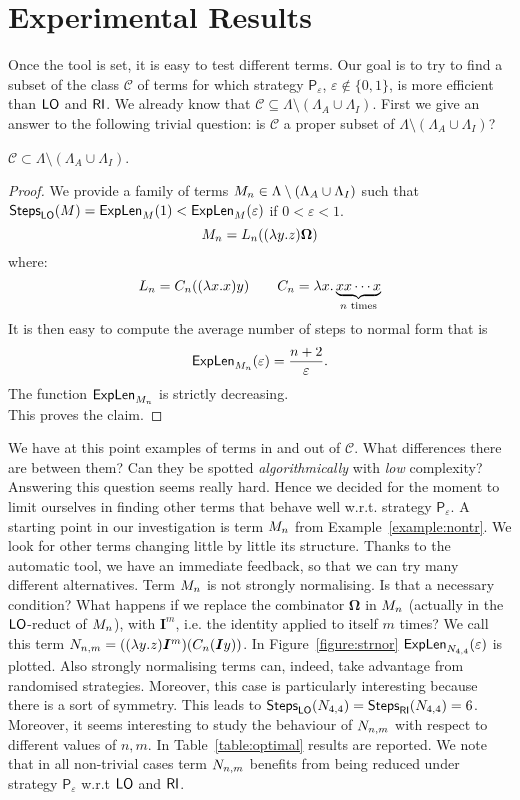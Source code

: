 \section{Experimental Results}
Once the tool is set, it is easy to test different terms. Our goal is to try to find a subset of the class $\mathcal{C}$ of terms for which strategy $\mathsf{P}_\varepsilon$, $\varepsilon\not\in\{0,1\}$, is more efficient than $\textsf{LO}$ and $\textsf{RI}$. We already know that $\mathcal{C}\subseteq\Lambda\setminus(\Lambda_A\cup\Lambda_I)$. First we give an answer to the following trivial question: is $\mathcal{C}$ a proper subset of $\Lambda\setminus(\Lambda_A\cup\Lambda_I)$?
\begin{proposition}\label{prop:strict}
	$\mathcal{C}\subset\Lambda\setminus(\Lambda_A\cup\Lambda_I)$.
\end{proposition}
\begin{proof}
	We provide a family of terms $M_n\in\Lambda\setminus(\Lambda_A\cup\Lambda_I)$ such that $\textsf{Steps}_{\textsf{LO}}(M)=\textsf{ExpLen}_{M}(1)<\textsf{ExpLen}_{M}(\varepsilon)$ if $0<\varepsilon<1$.
	$$
	M_n=L_n((\lambda y.z)\bm{\Omega})
	$$
	where:
	$$
	L_n = C_n((\lambda x.x)y)\qquad
	C_n = \lambda  x.\underbrace{xx\cdots x}_{n\text{ times}}
	$$
	It is then easy to compute the average number of steps to normal form that is
	$$
	\textsf{ExpLen}_{M_n}(\varepsilon)=\frac{n+2}{\varepsilon}.
	$$ 
	The function $\textsf{ExpLen}_{M_n}$ is strictly decreasing.\\
	This proves the claim.
\end{proof}
We have at this point examples of terms in and out of $\mathcal{C}$. What differences there are between them? Can they be spotted \emph{algorithmically} with \emph{low} complexity? Answering this question seems really hard. Hence we decided for the moment to limit ourselves in finding other terms that behave well w.r.t. strategy $\mathsf{P}_\varepsilon$. A starting point in our investigation is term $M_n$ from Example~\ref{example:nontr}. We look for other terms changing little by little its structure. Thanks to the automatic tool, we have an immediate feedback, so that we can try many different alternatives. Term $M_n$ is not strongly normalising. Is that a necessary condition? What happens if we replace the combinator $\bm{\Omega}$ in $M_n$ (actually in the $\textsf{LO}$-reduct of $M_n$), with $\mathbf{I}^m$, i.e. the identity applied to itself $m$ times? We call this term $N_{n,m}=((\lambda y.z)\bm{I}^m) (C_n(\bm{I}y))$. In Figure~\ref{figure:strnor} $\textsf{ExpLen}_{N_{4,4}}(\varepsilon)$ is plotted. Also strongly normalising terms can, indeed, take advantage from randomised strategies. Moreover, this case is particularly interesting because there is a sort of symmetry. This leads to $\textsf{Steps}_{\textsf{LO}}(N_{4,4})=\textsf{Steps}_{\textsf{RI}}(N_{4,4})=6$. Moreover, it seems interesting to study the behaviour of $N_{n,m}$ with respect to different values of $n,m$. In Table~\ref{table:optimal} results are reported. We note that in all non-trivial cases term $N_{n,m}$ benefits from being reduced under strategy $\mathsf{P}_\varepsilon$ w.r.t $\textsf{LO}$ and $\textsf{RI}$.
